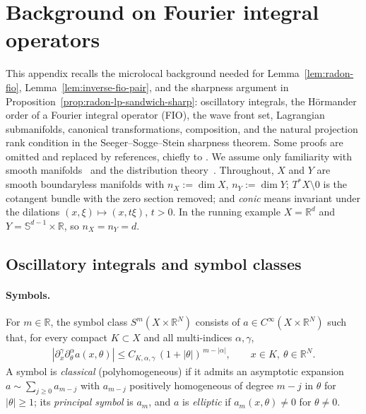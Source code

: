\documentclass[12pt]{article}
\numberwithin{equation}{section}
\numberwithin{figure}{section}
\numberwithin{equation}{section}
\newcommand{\R}{\mathbb{R}}
\newcommand{\Sph}{\mathbb S}
\newcommand{\abs}[1]{\left|#1\right|}
\begin{document}
\section{Background on Fourier integral operators}
\label{app:fio-background}
This appendix recalls the microlocal background needed for
Lemma~\ref{lem:radon-fio}, Lemma~\ref{lem:inverse-fio-pair}, and the sharpness
argument in Proposition~\ref{prop:radon-lp-sandwich-sharp}: oscillatory integrals,
the H\"ormander order of a Fourier integral operator (FIO), the wave front set,
Lagrangian submanifolds, canonical transformations, composition, and the natural
projection rank condition in the Seeger--Sogge--Stein sharpness theorem.
Some proofs are omitted and replaced by references, chiefly to
\cite{sogge_FourierIntegralsClassical_2017,%
hormander_LagrangianDistributionsFourier_2009,%
grigis_MicrolocalAnalysisDifferential_1994}.
We assume only familiarity with smooth manifolds~\cite{warner_FoundationsDifferentiableManifolds_1983}
and the distribution theory~\cite{friedlander_IntroductionTheoryDistributions_2003}.
Throughout, $X$ and $Y$ are smooth
boundaryless manifolds with $n_X:=\dim X$, $n_Y:=\dim Y$; $T^*X\setminus0$ is the
cotangent bundle with the zero section removed; and \emph{conic} means invariant
under the dilations $(x,\xi)\mapsto(x,t\xi)$, $t>0$.  In the running example
$X=\R^d$ and $Y=\Sph^{d-1}\times\R$, so $n_X=n_Y=d$.

\subsection{Oscillatory integrals and symbol classes}
\label{app:osc}

\paragraph{Symbols.}
For $m\in\R$, the symbol class $S^m(X\times\R^N)$ consists of
$a\in C^\infty(X\times\R^N)$ such that, for every compact $K\subset X$ and all
multi-indices $\alpha,\gamma$,
\begin{align*}
    \abs{\partial_x^{\gamma}\partial_\theta^\alpha a(x,\theta)}
    \le C_{K,\alpha,\gamma}\,(1+\abs\theta)^{\,m-\abs\alpha},
    \qquad x\in K,\ \theta\in\R^N.
\end{align*}
A symbol is \emph{classical} (polyhomogeneous) if it
admits an asymptotic expansion $a\sim\sum_{j\ge0}a_{m-j}$ with $a_{m-j}$ positively
homogeneous of degree $m-j$ in $\theta$ for $\abs\theta\ge1$; its \emph{principal
symbol} is $a_m$, and $a$ is \emph{elliptic} if $a_m(x,\theta)\neq0$ for
$\theta\neq0$.
\end{document}

